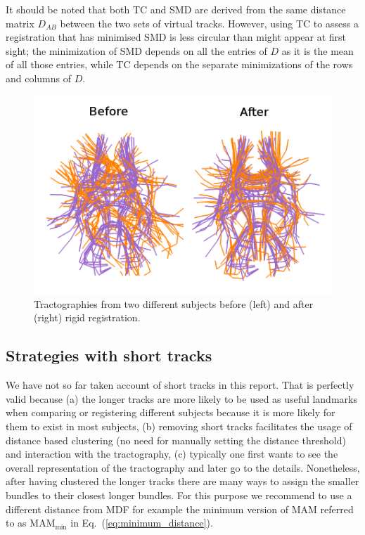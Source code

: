 \documentclass[journal]{IEEEtran}
\begin{document}
It should be noted that both TC and SMD are derived from the same
distance matrix $D_{AB}$ between the two sets of virtual
tracks. However, using TC to assess a registration that has minimised
SMD is less circular than might appear at first sight; the minimization
of SMD depends on all the entries of $D$ as it is the mean of all those
entries, while TC depends on the separate minimizations of the rows and
columns of $D$.

\begin{figure}
\begin{centering}
\includegraphics[scale=1.0]{Fig_9_QB_registration2_only_landscape}
\par\end{centering}
\caption{Tractographies from two different subjects
  before (left) and after (right) rigid registration.\label{Flo:direct_registration}}
\end{figure}

\subsection{Strategies with short tracks}

We have not so far taken account of short tracks in this report. That
is perfectly valid because (a) the longer tracks are more likely to
be used as useful landmarks when comparing or registering different
subjects because it is more likely for them to exist in most subjects,
(b) removing short tracks facilitates the usage of distance based
clustering (no need for manually setting the distance threshold) and
interaction with the tractography, (c) typically one first wants to
see the overall representation of the tractography and later go to
the details. Nonetheless, after having clustered the longer tracks
there are many ways to assign the smaller bundles to their closest
longer bundles. For this purpose we recommend to use a different distance
from MDF for example the minimum version of MAM referred
to as $\textrm{MAM}_{\textrm{min}}$ in Eq.~(\ref{eq:minimum_distance}). 
\end{document}
